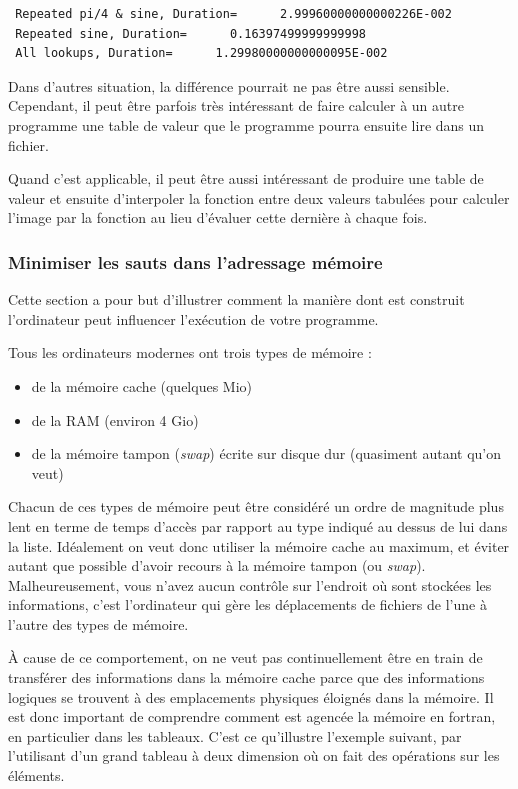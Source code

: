 \documentclass[a4paper,twoside]{article}
\begin{document}
\begin{verbatim}
 Repeated pi/4 & sine, Duration=      2.99960000000000226E-002
 Repeated sine, Duration=      0.16397499999999998     
 All lookups, Duration=      1.29980000000000095E-002
\end{verbatim}

\begin{remarque}
Dans d'autres situation, la différence pourrait ne pas être aussi sensible. Cependant, il peut être parfois très intéressant de faire calculer à un autre programme une table de valeur que le programme pourra ensuite lire dans un fichier.

Quand c'est applicable, il peut être aussi intéressant de produire une table de valeur et ensuite d'interpoler la fonction entre deux valeurs tabulées pour calculer l'image par la fonction au lieu d'évaluer cette dernière à chaque fois.
\end{remarque}

\subsubsection{Minimiser les sauts dans l'adressage mémoire}\label{sec:indices_loops}
Cette section a pour but d'illustrer comment la manière dont est construit l'ordinateur peut influencer l'exécution de votre programme.

Tous les ordinateurs modernes ont trois types de mémoire :
\begin{itemize}
\item de la mémoire cache (quelques Mio)
\item de la RAM (environ 4 Gio)
\item de la mémoire tampon (\textit{swap}) écrite sur disque dur (quasiment autant qu'on veut)
\end{itemize}
Chacun de ces types de mémoire peut être considéré un ordre de magnitude plus lent en terme de temps d'accès par rapport au type indiqué au dessus de lui dans la liste. Idéalement on veut donc utiliser la mémoire cache au maximum, et éviter autant que possible d'avoir recours à la mémoire tampon (ou \textit{swap}). Malheureusement, vous n'avez aucun contrôle sur l'endroit où sont stockées les informations, c'est l'ordinateur qui gère les déplacements de fichiers de l'une à l'autre des types de mémoire. 

\begin{important}
À cause de ce comportement, on ne veut pas continuellement être en train de transférer des informations dans la mémoire cache parce que des informations logiques se trouvent à des emplacements physiques éloignés dans la mémoire. Il est donc important de comprendre comment est agencée la mémoire en fortran, en particulier dans les tableaux. C'est ce qu'illustre l'exemple suivant, par l'utilisant d'un grand tableau à deux dimension où on fait des opérations sur les éléments.
\end{important}
\end{document}
